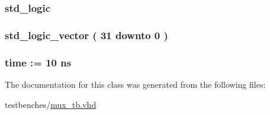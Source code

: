 \hypertarget{classmux__tb_1_1behavior_a25ec99ba02878236496471f1c0b4aca1}{
\subsubsection[{tb\-\_\-selector}]{ {\bfseries std\-\_\-logic } }}\label{classmux__tb_1_1behavior_a25ec99ba02878236496471f1c0b4aca1}
\hypertarget{classmux__tb_1_1behavior_a1ef2cbfab26351585dd50c0f22be5fa6}{
\subsubsection[{tb\-\_\-vec\-\_\-out}]{ {\bfseries std\-\_\-logic\-\_\-vector (   31    downto    0  ) } }}\label{classmux__tb_1_1behavior_a1ef2cbfab26351585dd50c0f22be5fa6}
\hypertarget{classmux__tb_1_1behavior_a204a2fe2cd2e77cb28f30aeab011e19e}{
\subsubsection[{clk\-\_\-period}]{ {\bfseries time  \-:=  10  ns } }}\label{classmux__tb_1_1behavior_a204a2fe2cd2e77cb28f30aeab011e19e}


\-The documentation for this class was generated from the following files\-:\begin{DoxyCompactItemize}
\item 
testbenches/\hyperlink{mux__tb_8vhd}{mux\-\_\-tb.\-vhd}\end{DoxyCompactItemize}
